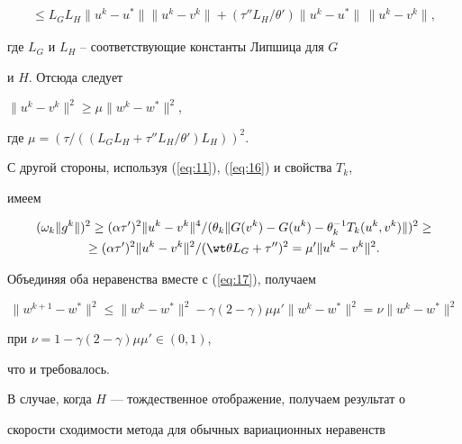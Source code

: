 \begin{pf}
\begin{multline*}
\leq L_{G} L_{H} \| u^{k} - u^{*} \| \| u^{k} - v^{k} \| 


+(\tau '' L_{H}/ \theta') \|u^{k} - u^{*}\|\,\|u^{k} - v^{k}\|, 


\end{multline*}


где $L_{G}$ и $L_{H}$ -- соответствующие константы Липшица для $G$ 


и $H$. Отсюда следует 


$\|u^{k} - v^{k}\|^{2} \geq \mu \|w^{k} - w^{*}\|^{2}$,


где $\mu=(\tau /((L_{G} L_{H}+\tau '' L_{H} / \theta ') L_{H}))^{2}$. 


С другой стороны, используя (\ref{eq:11}), (\ref{eq:16}) и свойства $T_{k}$,


имеем


\begin{multline*}


(\omega_{k} \|g^{k}\|)^{2} \geq (\alpha \tau ')^{2} \|u^{k} - v^{k} \|^{4} /


(\theta_{k} \|G(v^{k}) - G(u^{k}) -


\theta_{k}^{-1} T_{k}(u^{k}, v^{k}) \|)^{2} \ge \\


%


\geq (\alpha \tau ')^{2} \|u^{k} - v^{k} \|^{2} /


(\wt \theta L_{G}+\tau '')^{2} = \mu ' \|u^{k} - v^{k}\|^{2}. 


\end{multline*}


Объединяя оба неравенства вместе с (\ref{eq:17}), получаем 


$$


\|w^{k+1} - w^{*}\|^{2} \leq \|w^{k} - w^{*}\|^{2} - 


\gamma(2 - \gamma) \mu \mu ' \|w^{k} - w^{*}\|^{2} 


= \nu \|w^{k} - w^{*}\|^{2} 


$$


при $ \nu=1- \gamma(2 - \gamma) \mu \mu' \in(0,1)$, 


что и требовалось.


\end{pf}


 


В случае, когда $H$ --- тождественное отображение, получаем результат о 


скорости сходимости метода для обычных вариационных неравенств


